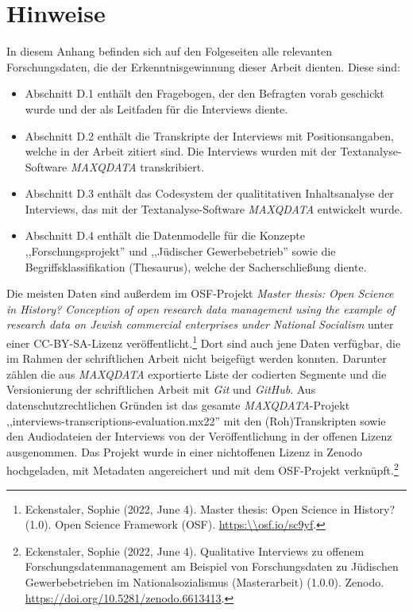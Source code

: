 
\section{Hinweise}

In diesem Anhang befinden sich auf den Folgeseiten alle relevanten Forschungsdaten, die der Erkenntnisgewinnung dieser Arbeit dienten. Diese sind:

\begin{itemize}
  \item Abschnitt D.1 enthält den Fragebogen, der den Befragten vorab geschickt wurde und der als Leitfaden für die Interviews diente.
  \item Abschnitt D.2 enthält die Transkripte der Interviews mit Positionsangaben, welche in der Arbeit zitiert sind. Die Interviews wurden mit der Textanalyse-Software \textit{MAXQDATA} transkribiert.
  \item Abschnitt D.3 enthält das Codesystem der qualititativen Inhaltsanalyse der Interviews, das mit der Textanalyse-Software \textit{MAXQDATA} entwickelt wurde.
  \item Abschnitt D.4 enthält die Datenmodelle für die Konzepte ,,Forschungsprojekt'' und ,,Jüdischer Gewerbebetrieb'' sowie die Begriffsklassifikation (Thesaurus), welche der Sacherschließung diente.
\end{itemize} 

Die meisten Daten sind außerdem im OSF-Projekt \textit{Master thesis: Open Science in History? Conception of open research data management using the example of research data on Jewish commercial enterprises under National Socialism} unter einer CC-BY-SA-Lizenz veröffentlicht.\footnote{Eckenstaler, Sophie (2022, June 4). Master thesis: Open Science in History? (1.0). Open Science Framework (OSF). \url{https:\\osf.io/sc9yf}.} Dort sind auch jene Daten verfügbar, die im Rahmen der schriftlichen Arbeit nicht beigefügt werden konnten. Darunter zählen die aus \textit{MAXQDATA} exportierte Liste der codierten Segmente und die Versionierung der schriftlichen Arbeit mit \textit{Git} und \textit{GitHub}. Aus datenschutzrechtlichen Gründen ist das gesamte \textit{MAXQDATA}-Projekt ,,interviews-transcriptions-evaluation.mx22'' mit den (Roh)Transkripten sowie den Audiodateien der Interviews von der Veröffentlichung in der offenen Lizenz ausgenommen. Das Projekt wurde in einer nichtoffenen Lizenz in Zenodo hochgeladen, mit Metadaten angereichert und mit dem OSF-Projekt verknüpft.\footnote{Eckenstaler, Sophie (2022, June 4). Qualitative Interviews zu offenem Forschungsdatenmanagement am Beispiel von Forschungsdaten zu Jüdischen Gewerbebetrieben im Nationalsozialismus (Masterarbeit) (1.0.0). Zenodo. \url{https://doi.org/10.5281/zenodo.6613413}.}

